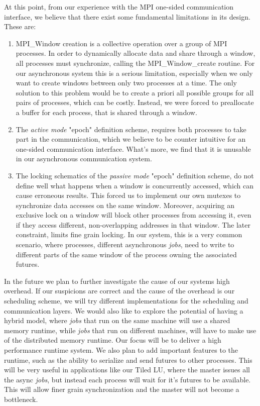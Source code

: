 At this point, from our experience with the MPI one-sided communication interface, we believe that there exist
some fundamental limitations in its design. These are:
\\
\begin{enumerate}
	\item MPI\_Window creation is a collective operation over a group of MPI processes.  In order to dynamically
				allocate data and share through a window, all processes must synchronize, calling the MPI\_Window\_create
				routine.  For our asynchronous system this is a serious limitation, especially when we only want to create
				windows between only two processes at a time.  The only solution to this problem would be to create a priori
				all possible groups for all pairs of processes, which can be costly.  Instead, we were forced to preallocate
				a buffer for each process, that is shared through a window.
	
	\item The \emph{active mode} "epoch" definition scheme, requires both processes to take part in the communication,
				which we believe to be counter intuitive for an one-sided communication interface. What's more, we find that
				it is unusable in our asynchronous communication system.

	\item The locking schematics of the \emph{passive mode} "epoch" definition scheme, do not define well what happens
				when a window is concurrently accessed, which can cause erroneous results.  This forced us to implement our
				own mutexes to synchronize data accesses on the same window.  Moreover, acquiring an exclusive lock on a 
				window will block other processes from accessing it, even if they access different, non-overlapping addresses
				in that window.  The later constraint, limits fine grain locking.  In our system, this is a very common
				scenario, where processes, different asynchronous \emph{jobs}, need to write to different parts of the same
		 		window of the process owning the associated futures.   
\\
\end{enumerate}

In the future we plan to further investigate the cause of our systems high overhead.  If our suspicions are correct
and the cause of the overhead is our scheduling scheme, we will try different implementations for the scheduling 
and communication layers.  We would also like to explore the potential of having a hybrid model, where \emph{jobs}
that run on the same machine will use a shared memory runtime, while \emph{jobs} that run on different machines,
will have to make use of the distributed memory runtime.  Our focus will be to deliver a high performance runtime system.
We also plan to add important features to the runtime, such as the ability to serialize and send futures to other 
processes.  This will be very useful in applications like our Tiled LU, where the master issues all the async \emph{jobs},
but instead each process will wait for it's futures to be available. This will allow finer grain synchronization and
the master will not become a bottleneck.

